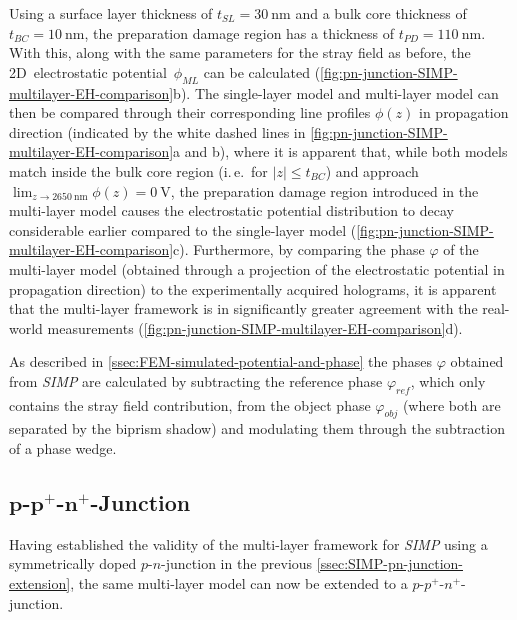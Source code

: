 Using a surface layer thickness of $t_{\mathit{SL}} = \SI{30}{\nm}$ and a bulk core thickness of $t_{\mathit{BC}} = \SI{10}{\nm}$, the preparation damage region has a thickness of $t_{\mathit{PD}} = \SI{110}{\nm}$. With this, along with the same parameters for the stray field as before, the 2D~electrostatic potential~$\phi_{\mathit{ML}}$ can be calculated (\cref{fig:pn-junction-SIMP-multilayer-EH-comparison}b). The single-layer model and multi-layer model can then be compared through their corresponding line profiles $\phi\left(z\right)$ in propagation direction (indicated by the white dashed lines in \cref{fig:pn-junction-SIMP-multilayer-EH-comparison}a and b), where it is apparent that, while both models match inside the bulk core region (i.\,e.\ for $\lvert z \rvert \leq t_{\mathit{BC}}$) and approach $\lim_{z\to\SI{2650}{\nm}} \phi\left(z\right) = \SI{0}{\volt}$, the preparation damage region introduced in the multi-layer model causes the electrostatic potential distribution to decay considerable earlier compared to the single-layer model (\cref{fig:pn-junction-SIMP-multilayer-EH-comparison}c). Furthermore, by comparing the phase $\varphi$ of the multi-layer model (obtained through a projection of the electrostatic potential in propagation direction) to the experimentally acquired holograms, it is apparent that the multi-layer framework is in significantly greater agreement with the real-world measurements (\cref{fig:pn-junction-SIMP-multilayer-EH-comparison}d).

As described in \cref{ssec:FEM-simulated-potential-and-phase} the phases $\varphi$ obtained from \emph{SIMP} are calculated by subtracting the reference phase $\varphi_{\mathit{ref}}$, which only contains the stray field contribution, from the object phase $\varphi_{\mathit{obj}}$ (where both are separated by the biprism shadow) and modulating them through the subtraction of a phase wedge.
\newpage
\subsection[\texorpdfstring{$p$-$p^+$-$n^+$}{\textit{p}-\textit{p}\textsuperscript{+}-\textit{n}\textsuperscript{+}}-Junction]{$\boldsymbol{p}$-$\boldsymbol{p^+}$-$\boldsymbol{n^+}$-Junction} \label{ssec:SIMP-ppn-junction-extension}
Having established the validity of the multi-layer framework for \emph{SIMP} using a symmetrically doped $p$-$n$-junction in the previous \cref{ssec:SIMP-pn-junction-extension}, the same multi-layer model can now be extended to a $p$-$p^+$-$n^+$-junction.

